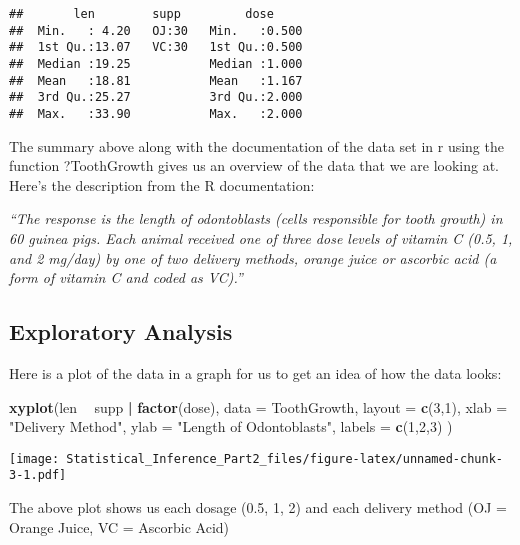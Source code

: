 \documentclass[
]{article}
\newenvironment{Shaded}{\begin{snugshade}}{\end{snugshade}}
\newcommand{\DataTypeTok}[1]{\textcolor[rgb]{0.13,0.29,0.53}{#1}}
\newcommand{\DecValTok}[1]{\textcolor[rgb]{0.00,0.00,0.81}{#1}}
\newcommand{\KeywordTok}[1]{\textcolor[rgb]{0.13,0.29,0.53}{\textbf{#1}}}
\newcommand{\NormalTok}[1]{#1}
\newcommand{\OperatorTok}[1]{\textcolor[rgb]{0.81,0.36,0.00}{\textbf{#1}}}
\newcommand{\StringTok}[1]{\textcolor[rgb]{0.31,0.60,0.02}{#1}}
\begin{document}
\begin{verbatim}
##       len        supp         dose      
##  Min.   : 4.20   OJ:30   Min.   :0.500  
##  1st Qu.:13.07   VC:30   1st Qu.:0.500  
##  Median :19.25           Median :1.000  
##  Mean   :18.81           Mean   :1.167  
##  3rd Qu.:25.27           3rd Qu.:2.000  
##  Max.   :33.90           Max.   :2.000
\end{verbatim}

The summary above along with the documentation of the data set in r
using the function ?ToothGrowth gives us an overview of the data that we
are looking at. Here's the description from the R documentation:

\emph{``The response is the length of odontoblasts (cells responsible
for tooth growth) in 60 guinea pigs. Each animal received one of three
dose levels of vitamin C (0.5, 1, and 2 mg/day) by one of two delivery
methods, orange juice or ascorbic acid (a form of vitamin C and coded as
VC).''}

\hypertarget{exploratory-analysis}{%
\subsection{Exploratory Analysis}\label{exploratory-analysis}}

Here is a plot of the data in a graph for us to get an idea of how the
data looks:

\begin{Shaded}
\begin{Highlighting}[]
\KeywordTok{xyplot}\NormalTok{(len }\OperatorTok{~}\StringTok{ }\NormalTok{supp }\OperatorTok{|}\StringTok{ }\KeywordTok{factor}\NormalTok{(dose),}
       \DataTypeTok{data =}\NormalTok{ ToothGrowth,}
       \DataTypeTok{layout =} \KeywordTok{c}\NormalTok{(}\DecValTok{3}\NormalTok{,}\DecValTok{1}\NormalTok{),}
       \DataTypeTok{xlab =} \StringTok{"Delivery Method"}\NormalTok{,}
       \DataTypeTok{ylab =} \StringTok{"Length of Odontoblasts"}\NormalTok{,}
       \DataTypeTok{labels =} \KeywordTok{c}\NormalTok{(}\DecValTok{1}\NormalTok{,}\DecValTok{2}\NormalTok{,}\DecValTok{3}\NormalTok{)}
\NormalTok{       )}
\end{Highlighting}
\end{Shaded}

\texttt{[image: Statistical\_Inference\_Part2\_files/figure-latex/unnamed-chunk-3-1.pdf]}

The above plot shows us each dosage (0.5, 1, 2) and each delivery method
(OJ = Orange Juice, VC = Ascorbic Acid)
\end{document}
